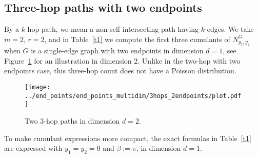 \documentclass[12pt]{article}
\numberwithin{equation}{section}
\begin{document}
\subsection{Three-hop paths with two endpoints}
\noindent
 By a $k$-hop path, we mean a non-self intersecting path having $k$ edges. 
 We take $m=2$, $r=2$, and in Table~\ref{t1} we 
 compute the first three cumulants of $N^G_{y_1,y_2}$ when $G$ is
 a single-edge graph with two endpoints in dimension $d=1$,
 see Figure~\ref{fig3} for an illustration in dimension $2$.  
 Unlike in the two-hop with two endpoints case, this three-hop count does not
 have a Poisson distribution.

\begin{figure}[H]
  \centering
    \texttt{[image: ../end\_points/end\_points\_multidim/3hops\_2endpoints/plot.pdf]} 
\caption{Two $3$-hop paths in dimension $d=2$.} 
\label{fig3}
\end{figure}

\vspace{-0.3cm} 

\noindent
 To make cumulant expressions more compact,
 the exact formulas in Table~\ref{t1} 
 are expressed with $y_1=y_2=0$ and $\beta := \pi$,
 in dimension $d=1$. 
\end{document}
